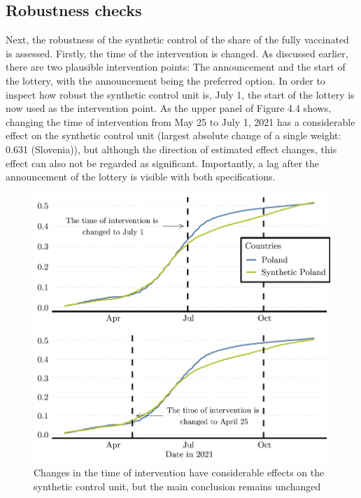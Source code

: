 \documentclass{scrbook}
\begin{document}
\subsection*{Robustness checks}

Next, the robustness of the synthetic control of the share of the fully
vaccinated is assessed. Firstly, the time of the intervention is
changed. As discussed earlier, there are two plausible intervention
points: The announcement and the start of the lottery, with the
announcement being the preferred option. In order to inspect how robust
the synthetic control unit is, July 1, the start of the lottery is now
used as the intervention point. As the upper panel of Figure 4.4 shows,
changing the time of intervention from May 25 to July 1, 2021 has a
considerable effect on the synthetic control unit (largest absolute
change of a single weight: 0.631 (Slovenia)), but although the direction
of estimated effect changes, this effect can also not be regarded as
significant. Importantly, a lag after the announcement of the lottery is
visible with both specifications.

\begin{figure}[h]
\caption[Robustness check: Time of intervention]{Changes in the time of intervention have considerable effects on the synthetic control unit, but the main conclusion remains unchanged}

\begin{center}\includegraphics{bachelor_thesis_files/figure-latex/unnamed-chunk-5-1} \end{center}



\begin{center}\includegraphics{bachelor_thesis_files/figure-latex/unnamed-chunk-5-2} \end{center}
\end{figure}
\end{document}
